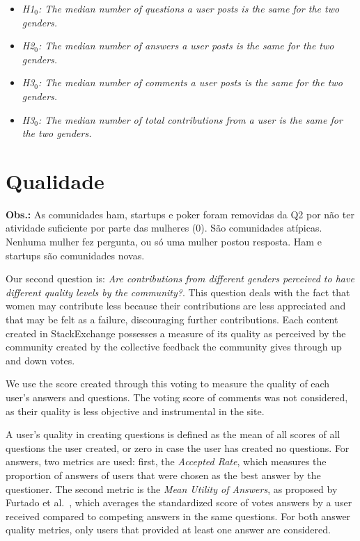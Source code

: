 \begin{itemize}
    \item \textit{H1$_0$: The median number of questions a user posts is the same for the two genders.}
    \item \textit{H2$_0$: The median number of answers a user posts is the same for the two genders.}
    \item \textit{H3$_0$: The median number of comments a user posts is the same for the two genders.}
    \item \textit{H3$_0$: The median number of total contributions from a user is the same for the two genders.}
\end{itemize}


\section{Qualidade} %
\label{sub:qualidade}

\textbf{Obs.:} As comunidades ham, startups e poker foram removidas da Q2 por não ter atividade suficiente por parte das mulheres (0). São comunidades atípicas. Nenhuma mulher fez pergunta, ou só uma mulher postou resposta. Ham e startups são comunidades novas.

Our second question is: \textit{Are contributions from different genders perceived to have different quality levels by the community?}. This question deals with the fact that women may contribute less because their contributions are less appreciated and that may be felt as a failure, discouraging further contributions. 
Each content created in StackExchange possesses a measure of its quality as perceived by the community created by the collective feedback the community gives through up and down votes. 

We use the score created through this voting to measure the quality of each user's answers and questions. The voting score of comments was not considered, as their quality is less objective and instrumental in the site. 

A user's quality in creating questions is defined as the mean of all scores of all questions the user created, or zero in case the user has created no questions. For answers, two metrics are used: first, the \emph{Accepted Rate}, which measures the proportion of answers of users that were chosen as the best answer by the questioner. The second metric is the  \emph{Mean Utility of Answers}, as proposed by Furtado et al.~\cite{furtado2013contributor}, which averages the standardized score of votes answers by a user received compared to competing answers in the same questions. For both answer quality metrics, only users that provided at least one answer are considered.

